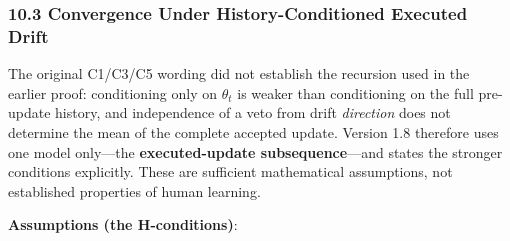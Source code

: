\documentclass[
  11pt]{article}
\begin{document}
\subsubsection{10.3 Convergence Under History-Conditioned Executed
Drift}\label{convergence-under-history-conditioned-executed-drift}

The original C1/C3/C5 wording did not establish the recursion used in
the earlier proof: conditioning only on \(\theta_t\) is weaker than
conditioning on the full pre-update history, and independence of a veto
from drift \emph{direction} does not determine the mean of the complete
accepted update. Version 1.8 therefore uses one model only---the
\textbf{executed-update subsequence}---and states the stronger
conditions explicitly. These are sufficient mathematical assumptions,
not established properties of human learning.

\textbf{Assumptions (the H-conditions)}:
\end{document}
